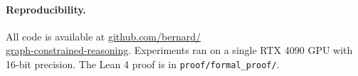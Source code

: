 \documentclass[11pt,twoside]{article}
\begin{document}
\paragraph{Reproducibility.}
All code is available at
\href{https://github.com/bernard/graph-constrained-reasoning}{github.com/bernard/ \\ graph-constrained-reasoning}.
Experiments ran on a single RTX 4090 GPU with 16-bit precision.
The Lean 4 proof is in \texttt{proof/formal\_proof/}.



\end{document}
